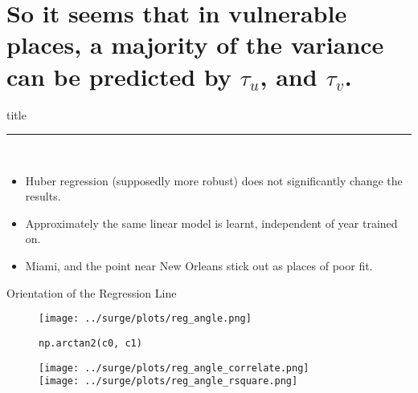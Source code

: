 \section{So it seems that in vulnerable places,
         a  majority of the variance can be predicted by $\tau_u$, and $\tau_v$.}
    \begin{frame}[plain]
        \vfill
      \centering
      \begin{beamercolorbox}[sep=8pt,center,shadow=true,rounded=true]{title}
        \insertsectionhead\par%
        \color{oxfordblue}\noindent\rule{10cm}{1pt} \\
        \begin{itemize}
        \item Huber regression (supposedly more robust) does not significantly change the results.
        \item Approximately the same linear model is learnt, independent of year trained on.
        \item Miami, and the point near New Orleans stick out as places of poor fit.
        \end{itemize}
      \end{beamercolorbox}
      \vfill
  \end{frame}


  \begin{frame}{Orientation of the Regression Line}
\vspace{-30pt}
\hspace{-30pt}
 \begin{minipage}{1.1\textwidth}
 \begin{minipage}{0.7\textwidth}
\begin{figure}
   \hspace{-40pt} \texttt{[image: ../surge/plots/reg\_angle.png]}
    \vspace{-15pt}
   \caption{\texttt{np.arctan2(c0, c1)}}
    \label{fig:A}
\end{figure}
\end{minipage}
 \begin{minipage}{0.28\textwidth}
\begin{figure}[htb!]
        \vspace{-25pt}
   \hspace{-40pt} \texttt{[image: ../surge/plots/reg\_angle\_correlate.png]}\\
    \hspace{-40pt} \texttt{[image: ../surge/plots/reg\_angle\_rsquare.png]}
\end{figure}
\end{minipage}
\end{minipage}
\end{frame}

